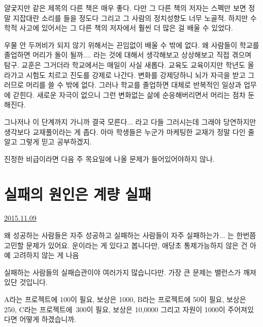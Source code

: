 얄궃지만 같은 제목의 다른 책은 매우 좋다. 다만 그 다른 책의 저자는 스펙만 보면 정말 지잡대란 소리를 들을 정도다
그리고 그 사람의 정치성향도 너무 노골적.
하지만 수학적 사고에 있어서는 그 다른 책의 저자에서 훨씬 더 많은 걸 배울 수 있었다.
\vspace{5mm}

우물 안 두꺼비가 되지 않기 위해서는 끈임없이 배울 수 밖에 없다.
왜 사람들이 학교를 졸업하면 머리가 돌이 될까.... 라는 것에 대해서 생각해보고 상상해보고 직접 겪으며 탐구.
교훈은 그거더라
학교에서는 매일이 사실 새롭다. 교육도 교육이지만 학년도 올라가고 시험도 치르고 진도를 강제로 나간다.
변화를 강제당하니 뇌가 자극을 받고 그러므로 머리를 쓸 수 밖에 없다.
그러나 학교를 졸업하면 대체로 반복적인 일상과 업무에 갇힌다.
새로운 자극이 없으니 그런 변화없는 삶에 순응해버리면서 머리는 점차 둔해진다.
\vspace{5mm}

그나저나 이 단계까지 가니까 결국 모른다... 라고 다들 그러시는데 그래야 당연하지만
생각보다 교재풀이라는 게 좁다.
아마 학생들은 누군가 마케팅한 교재가 정말 다인 줄 알고 그렇게 믿고 공부하겠지.
\vspace{5mm}

진정한 비급이라면 다음 주 목요일에 나올 문제가 들어있어야하지 않나.
\vspace{5mm}







\section{실패의 원인은 계량 실패}
\href{https://www.kockoc.com/Apoc/472231}{2015.11.09}

\vspace{5mm}

왜 성공하는 사람들은 자주 성공하고 실패하는 사람들이 자주 실패하는가... 는 한번쯤 고민할 문제가 있어요.
운이라는 게 있다고 봅니다만, 애당초 통제가능하지 않은 건 아예 고려하지 않는 게 나음
\vspace{5mm}

실패하는 사람들의 실패습관이야 여러가지 많습니다만.
가장 큰 문제는 밸런스가 깨져있단 것입니다.
\vspace{5mm}

A라는 프로젝트에 100이 필요, 보상은 1000, B라는 프로젝트에 50이 필요, 보상은 250, C라는 프로젝트에 300이 필요, 보상은 10,0000
그리고 자원이 1000이 주어져있다면 어떻게 하겠습니까.
\vspace{5mm}

